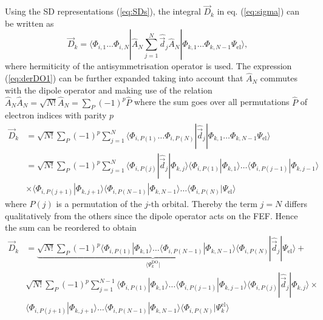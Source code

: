 Using the SD representations (\ref{eq:SDs}), the integral $\vec{D}_k$ in eq. (\ref{eq:sigma}) can be written as
\begin{equation} \label{eq:derDO1}
\vec{D}_k = \langle
\Phi_{i,1}  \hdots\Phi_{i,N} | \hat{A}_N \sum_{j=1}^N\hat{\vec{d}}_j \hat{A}_N |
\Phi_{k,1}\hdots\Phi_{k,N-1} \Psi_\text{el} 
\rangle ,
\end{equation}
where hermiticity of the antisymmetrisation operator is used.
The expression (\ref{eq:derDO1}) can be further expanded taking into account that $\hat{A}_N$ commutes with the dipole operator and making use of the relation $\hat{A}_N\hat{A}_N=\sqrt{N!}\hat{A}_N=\sum_P (-1)^p \hat{P}$ where the sum goes over all permutations $\hat{P}$ of electron indices with parity $p$
\begin{align} \label{eq:derDO2}
\vec{D}_k & = \sqrt{N!}\sum_P (-1)^p \sum_{j=1}^N \langle
\Phi_{i,P(1)}\hdots\Phi_{i,P(N)} |\hat{\vec{d}}_j |
\Phi_{k,1}\hdots\Phi_{k,N-1} \Psi_\text{el}  \rangle  \\
  & = \sqrt{N!}\sum_P (-1)^p \sum_{j=1}^N 
  \langle \Phi_{i,P(j)} | \hat{\vec{d}}_j | \Phi_{k,j} \rangle
          \langle \Phi_{i,P(1)}  |\Phi_{k,1}   \rangle
  \hdots  \langle \Phi_{i,P(j-1)}|\Phi_{k,j-1} \rangle \\
  & \times\langle \Phi_{i,P(j+1)}|\Phi_{k,j+1} \rangle
          \langle \Phi_{i,P(N-1)}|\Phi_{k,N-1} \rangle
  \hdots  \langle \Phi_{i,P(N)}  |\Psi_\text{el}\rangle 
\end{align}
where $P(j)$ is a permutation of the $j$-th orbital.
Thereby the term $j=N$ differs qualitatively from the others since the dipole operator acts on the FEF.
Hence the sum can be reordered to obtain
\begin{align} \label{eq:fullDO}
  \vec{D}_k & = 
  \underbrace{\sqrt{N!}\sum_P (-1)^p 
          \langle \Phi_{i,P(1)}  |\Phi_{k,1}    \rangle
  \hdots  \langle \Phi_{i,P(N-1)}|\Phi_{k,N-1}  \rangle
  \langle \Phi_{i,P(N)} }_{\langle \Psi_k^\text{DO}|} | \hat{\vec{d}}_j | \Psi_\text{el} \rangle + \nonumber \\
  & 
       \sqrt{N!}\sum_P (-1)^p \sum_{j=1}^{N-1} 
          \langle \Phi_{i,P(1)}  |\Phi_{k,1}    \rangle
  \hdots  \langle \Phi_{i,P(j-1)}|\Phi_{k,j-1}  \rangle
  \langle \Phi_{i,P(j)}|\hat{\vec{d}}_j |\Phi_{k,j}\rangle \times \nonumber \\
  &       \langle \Phi_{i,P(j+1)}|\Phi_{k,j+1}  \rangle
  \hdots  \langle \Phi_{i,P(N-1)}|\Phi_{k,N-1}  \rangle
  \langle \Phi_{i,P(N)}| \Psi_k^\text{el} \rangle
\end{align}
